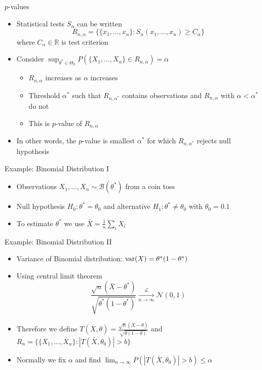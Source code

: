 \documentclass{beamer}
\begin{document}
\begin{frame}{$p$-values} 
\begin{itemize} 
 \item Statistical tests $S_n$ can be written 
 \begin{displaymath} 
  R_{n, \alpha} = \{\{x_1, \ldots, x_n\}: S_n(x_1, \ldots, x_n) \geq C_\alpha\}
 \end{displaymath}
  where $C_\alpha \in \mathbb{R}$ is test criterion 
 \item Consider $\sup_{\theta^* \in \Theta_0} P(\{X_1, \ldots, X_n\} \in R_{n, \alpha}) = \alpha$
  \begin{itemize}
  \item $R_{n, \alpha}$ increases as $\alpha$ increases 
  \item Threshold $\alpha^*$ such that $R_{n, \alpha^*}$ contains observations and $R_{n, \alpha}$ with $\alpha < \alpha^*$ do not 
  \item This is $p$-value of $R_{n, \alpha}$ 
  \end{itemize} 
 \item In other words, the $p$-value is smallest $\alpha^*$ for which $R_{n, \alpha^*}$ rejects null hypothesis  
\end{itemize}
\end{frame}


\begin{frame}{Example: Binomial Distribution I}  
\begin{itemize} 
 \item Observations $X_1, \ldots, X_n \sim \mathcal{B}(\theta^*)$ from a coin toss
 \item Null hypothesis $H_0: \theta^* = \theta_0$ and alternative $H_1: \theta^* \neq \theta_0$ with $\theta_0 = 0.1$ 
 \item To estimate $\theta^*$ we use $\bar{X} = \frac{1}{n}\sum_i X_i$ 
\end{itemize} 
\end{frame}

\begin{frame}{Example: Binomial Distribution II} 
\begin{itemize} 
\item Variance of Binomial distribution: $\mbox{var}(X) = \theta^*(1- \theta^*)$
\item Using central limit theorem 
\begin{displaymath} 
 \frac{\sqrt{n}(\bar{X} - \theta^*)}{\sqrt{\theta^*(1- \theta^*)}} \xrightarrow[n \rightarrow \infty]{\mathcal{L}} \mathcal{N}(0, 1)
\end{displaymath}
\item Therefore we define $T(\bar{X}, \theta) = \frac{\sqrt{n}(\bar{X} - \theta)}{\sqrt{\theta(1- \theta)}}$ and $R_n = \{\{X_1, \ldots, X_n\}: |T(\bar{X}, \theta_0)| > b\}$
\item Normally we fix $\alpha$ and find $\lim_{n \rightarrow \infty} P(|T(\bar{X}, \theta_0)| > b) \leq \alpha$ 
\end{itemize}
\end{frame}
\end{document}
